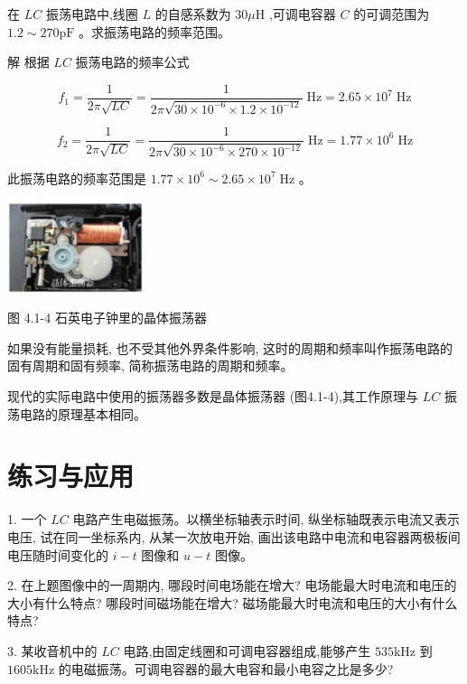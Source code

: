 \documentclass[10pt]{article}
\begin{document}
在 \({LC}\) 振荡电路中,线圈 \(L\) 的自感系数为 \({30\mu }\mathrm{H}\) ,可调电容器 \(C\) 的可调范围为 \({1.2} \sim {270}\mathrm{{pF}}\) 。求振荡电路的频率范围。

解 根据 \({LC}\) 振荡电路的频率公式

\[
{f}_{1} = \frac{1}{{2\pi }\sqrt{LC}} = \frac{1}{{2\pi }\sqrt{{30} \times {10}^{-6} \times {1.2} \times {10}^{-{12}}}}\mathrm{\;{Hz}} = {2.65} \times {10}^{7}\mathrm{\;{Hz}}
\]

\[
{f}_{2} = \frac{1}{{2\pi }\sqrt{LC}} = \frac{1}{{2\pi }\sqrt{{30} \times {10}^{-6} \times {270} \times {10}^{-{12}}}}\mathrm{\;{Hz}} = {1.77} \times {10}^{6}\mathrm{\;{Hz}}
\]

此振荡电路的频率范围是 \({1.77} \times {10}^{6} \sim {2.65} \times {10}^{7}\mathrm{\;{Hz}}\) 。

\begin{center}
\includegraphics[max width=0.3\textwidth]{images/01910e72-c5b7-7ed5-a6d4-fb3a5faefc32_80_269316.jpg}
\end{center}

图 4.1-4 石英电子钟里的晶体振荡器

如果没有能量损耗, 也不受其他外界条件影响, 这时的周期和频率叫作振荡电路的固有周期和固有频率, 简称振荡电路的周期和频率。

现代的实际电路中使用的振荡器多数是晶体振荡器 (图4.1-4),其工作原理与 \({LC}\) 振荡电路的原理基本相同。

\section*{练习与应用}

1. 一个 \({LC}\) 电路产生电磁振荡。以横坐标轴表示时间, 纵坐标轴既表示电流又表示电压, 试在同一坐标系内, 从某一次放电开始, 画出该电路中电流和电容器两极板间电压随时间变化的 \(i - t\) 图像和 \(u - t\) 图像。

2. 在上题图像中的一周期内, 哪段时间电场能在增大? 电场能最大时电流和电压的大小有什么特点? 哪段时间磁场能在增大? 磁场能最大时电流和电压的大小有什么特点?

3. 某收音机中的 \({LC}\) 电路,由固定线圈和可调电容器组成,能够产生 \({535}\mathrm{{kHz}}\) 到 \({1605}\mathrm{{kHz}}\) 的电磁振荡。可调电容器的最大电容和最小电容之比是多少?
\end{document}
